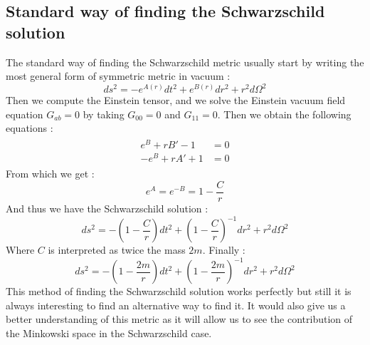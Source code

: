 \documentclass[a4paper,12pt]{article}
\theoremstyle{definition}
\begin{document}
\subsection{Standard way of finding the Schwarzschild solution}
The standard way of finding the Schwarzschild metric usually start by writing the most general form of symmetric metric in vacuum :
\begin{equation}
	ds^2=-e^{A(r)}dt^2+e^{B(r)}dr^2+r^2d\Omega^2
\end{equation}
Then we compute the Einstein tensor, and we solve the Einstein vacuum field equation $G_{ab}=0$ by taking $G_{00}=0$ and $G_{11}=0$.
Then we obtain the following equations :
\begin{align}
\begin{split}
	e^B+rB'-1&=0\\
	-e^B+rA'+1&=0
\end{split}
\end{align}
From which we get :
\begin{equation}
	e^A=e^{-B}=1-\frac{C}{r}
\end{equation}
And thus we have the Schwarzschild solution :
\begin{equation}
	ds^2=-(1-\frac{C}{r})dt^2+(1-\frac{C}{r})^{-1}dr^2+r^2d\Omega^2
\end{equation}
Where $C$ is interpreted as twice the mass $2m$.
Finally :
\begin{equation}
	ds^2=-(1-\frac{2m}{r})dt^2+(1-\frac{2m}{r})^{-1}dr^2+r^2d\Omega^2
\end{equation}
This method of finding the Schwarzschild solution works perfectly but still it is always interesting to find an alternative way to find it.
It would also give us a better understanding of this metric as it will allow us to see the contribution of the Minkowski space in the Schwarzschild case.
\end{document}
